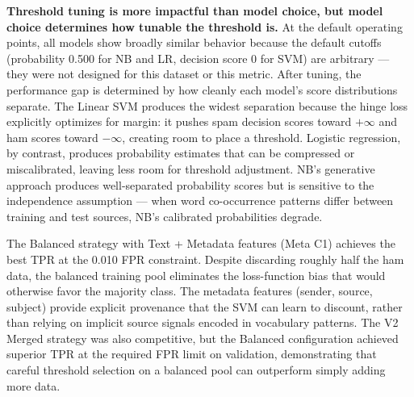 \begin{notebox}
\textbf{Threshold tuning is more impactful than model choice, but model choice determines how tunable the threshold is.} At the default operating points, all models show broadly similar behavior because the default cutoffs (probability 0.500 for NB and LR, decision score 0 for SVM) are arbitrary — they were not designed for this dataset or this metric. After tuning, the performance gap is determined by how cleanly each model's score distributions separate. The Linear SVM produces the widest separation because the hinge loss explicitly optimizes for margin: it pushes spam decision scores toward $+\infty$ and ham scores toward $-\infty$, creating room to place a threshold. Logistic regression, by contrast, produces probability estimates that can be compressed or miscalibrated, leaving less room for threshold adjustment. NB's generative approach produces well-separated probability scores but is sensitive to the independence assumption — when word co-occurrence patterns differ between training and test sources, NB's calibrated probabilities degrade.

The Balanced strategy with Text + Metadata features (Meta C1) achieves the best TPR at the 0.010 FPR constraint. Despite discarding roughly half the ham data, the balanced training pool eliminates the loss-function bias that would otherwise favor the majority class. The metadata features (sender, source, subject) provide explicit provenance that the SVM can learn to discount, rather than relying on implicit source signals encoded in vocabulary patterns. The V2 Merged strategy was also competitive, but the Balanced configuration achieved superior TPR at the required FPR limit on validation, demonstrating that careful threshold selection on a balanced pool can outperform simply adding more data.
\end{notebox}

